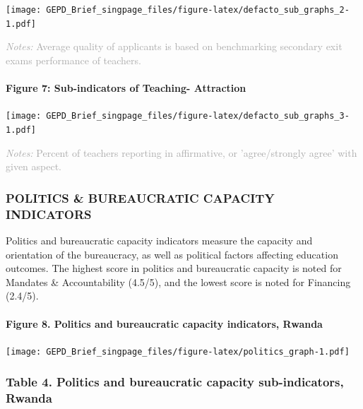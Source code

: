 \documentclass[
]{article}
\begin{document}
\texttt{[image: GEPD\_Brief\_singpage\_files/figure-latex/defacto\_sub\_graphs\_2-1.pdf]}

{\scriptsize
    \textcolor{darkgray}{\textit{Notes:} Average quality of applicants is based on benchmarking secondary exit exams performance of teachers.}
  }

\hypertarget{figure-7-sub-indicators-of-teaching--attraction}{%
\paragraph{Figure 7: Sub-indicators of Teaching-
Attraction}\label{figure-7-sub-indicators-of-teaching--attraction}}

\texttt{[image: GEPD\_Brief\_singpage\_files/figure-latex/defacto\_sub\_graphs\_3-1.pdf]}

{\scriptsize
    \textcolor{darkgray}{\textit{Notes:} Percent of teachers reporting in affirmative, or 'agree/strongly agree' with given aspect.}
  }

\vfill\null

\hypertarget{politics-bureaucratic-capacity-indicators}{%
\subsubsection{\texorpdfstring{\textbf{POLITICS \& BUREAUCRATIC CAPACITY
INDICATORS}}{POLITICS \& BUREAUCRATIC CAPACITY INDICATORS}}\label{politics-bureaucratic-capacity-indicators}}

Politics and bureaucratic capacity indicators measure the capacity and
orientation of the bureaucracy, as well as political factors affecting
education outcomes. The highest score in politics and bureaucratic
capacity is noted for Mandates \& Accountability (4.5/5), and the lowest
score is noted for Financing (2.4/5).

\hypertarget{figure-8.-politics-and-bureaucratic-capacity-indicators-rwanda}{%
\paragraph{Figure 8. Politics and bureaucratic capacity indicators,
Rwanda}\label{figure-8.-politics-and-bureaucratic-capacity-indicators-rwanda}}

\texttt{[image: GEPD\_Brief\_singpage\_files/figure-latex/politics\_graph-1.pdf]}

\hypertarget{table-4.-politics-and-bureaucratic-capacity-sub-indicators-rwanda}{%
\subsubsection{Table 4. Politics and bureaucratic capacity
sub-indicators,
Rwanda}\label{table-4.-politics-and-bureaucratic-capacity-sub-indicators-rwanda}}
\end{document}
